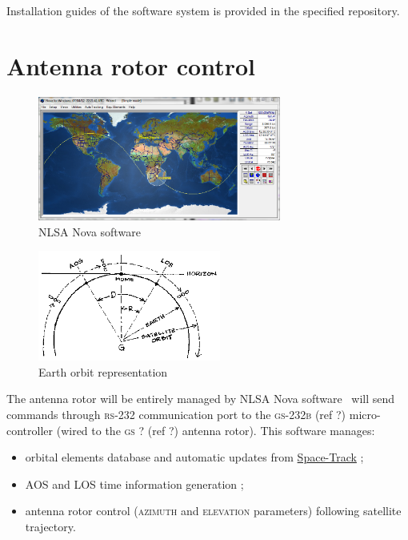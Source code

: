 \documentclass[a4paper]{report}
\begin{document}
Installation guides of the software system is provided in the specified repository.

\section{Antenna rotor control}

\begin{figure}[h]
  \begin{center}
  \includegraphics[width=8cm]{pictures/nova3.png}
  \end{center}
\caption{NLSA Nova software}
\label{fig:nlsa_nova}
\end{figure}

\begin{figure}[h]
  \begin{center}
  \includegraphics[width=6cm]{pictures/orbitdra.png}
  \end{center}
\caption{Earth orbit representation}
\label{fig:aos_los}
\end{figure}

The antenna rotor will be entirely managed by NLSA Nova software~\cite{nova_um} will send commands through \textsc{rs-232} communication port to the \textsc{gs-232b} (ref ?) micro-controller (wired to the \textsc{gs ?} (ref ?) antenna rotor). This software manages:
\begin {itemize}
\item {orbital elements database and automatic updates from \href{https://www.space-track.org}{Space-Track} ;}
\item {AOS and LOS time information generation ;}
\item {antenna rotor control (\textsc{azimuth} and \textsc{elevation} parameters) following satellite trajectory.}
\end {itemize}
\end{document}
